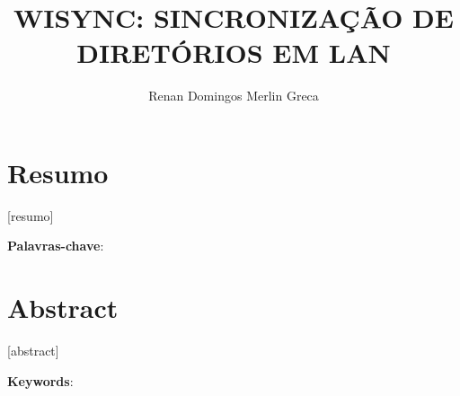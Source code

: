 \documentclass[12pt,a4paper]{ufpr}
\title{WISYNC: SINCRONIZAÇÃO DE DIRETÓRIOS EM LAN}
\author{Renan Domingos Merlin Greca}
\begin{document}
\makecapa
\makerosto         %

\doublespacing            %

\pagestyle{headings}


\tableofcontents




\chapter*{Resumo}

[resumo]

\noindent \textbf{Palavras-chave}:

\chapter*{Abstract}

[abstract]

\noindent \textbf{Keywords}:

\newpage




\end{document}
